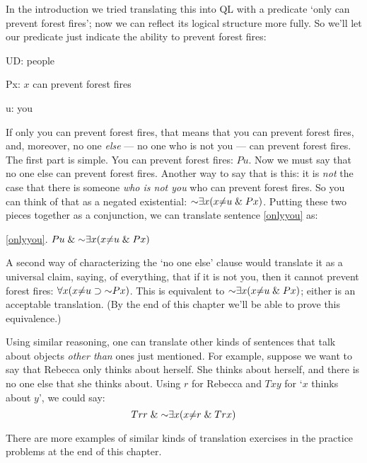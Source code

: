 In the introduction we tried translating this into QL with a predicate `only  \blank can prevent forest fires'; now we can reflect its logical structure more fully. So we'll let our predicate just indicate the ability to prevent forest fires:

\begin{ekey}
\item[UD:] people
\item[Px:] $x$ can prevent forest fires
\item[u:] you
\end{ekey}

If only you can prevent forest fires, that means that you can prevent forest fires, and, moreover, no one \emph{else} --- no one who is not you --- can prevent forest fires. The first part is simple. You can prevent forest fires: $Pu$. Now we must say that no one else can prevent forest fires. Another way to say that is this: it is \emph{not} the case that there is someone \emph{who is not you} who can prevent forest fires. So you can think of that as a negated existential: $\enot \qt{\exists}{x} (x {\neq} u \eand Px)$. Putting these two pieces together as a conjunction, we can translate sentence \ref{onlyyou} as:

\begin{earg}
\item[\ref{onlyyou}.] $Pu \eand \enot \qt{\exists}{x} (x {\neq} u \eand Px)$
\end{earg}

A second way of characterizing the `no one else' clause would translate it as a universal claim, saying, of everything, that if it is not you, then it cannot prevent forest fires: $\qt{\forall}{x} (x {\neq} u \eif \enot Px)$. This is equivalent to $\enot \qt{\exists}{x} (x {\neq} u \eand Px)$; either is an acceptable translation. (By the end of this chapter we'll be able to prove this equivalence.)

Using similar reasoning, one can translate other kinds of sentences that talk about objects \emph{other than} ones just mentioned. For example, suppose we want to say that Rebecca only thinks about herself. She thinks about herself, and there is no one else that she thinks about. Using $r$ for Rebecca and $Txy$ for `$x$ thinks about $y$', we could say: $$Trr \eand \enot \qt{\exists}{x} (x {\neq} r \eand Trx)$$

There are more examples of similar kinds of translation exercises in the practice problems at the end of this chapter.

